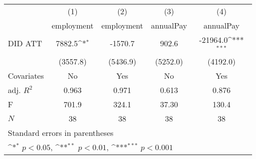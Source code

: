 {
\def\sym#1{\ifmmode^{#1}\else\(^{#1}\)\fi}
\begin{tabular}{l*{4}{c}}
\hline\hline
            &\multicolumn{1}{c}{(1)}&\multicolumn{1}{c}{(2)}&\multicolumn{1}{c}{(3)}&\multicolumn{1}{c}{(4)}\\
            &\multicolumn{1}{c}{employment}&\multicolumn{1}{c}{employment}&\multicolumn{1}{c}{annualPay}&\multicolumn{1}{c}{annualPay}\\
\hline
DID ATT     &      7882.5\sym{*}  &     -1570.7         &       902.6         &    -21964.0\sym{***}\\
            &    (3557.8)         &    (5436.9)         &    (5252.0)         &    (4192.0)         \\
[1em]
Covariates  &          No         &         Yes         &          No         &         Yes         \\
\hline
adj. \(R^{2}\)&       0.963         &       0.971         &       0.613         &       0.876         \\
F           &       701.9         &       324.1         &       37.30         &       130.4         \\
\(N\)       &          38         &          38         &          38         &          38         \\
\hline\hline
\multicolumn{5}{l}{\footnotesize Standard errors in parentheses}\\
\multicolumn{5}{l}{\footnotesize \sym{*} \(p<0.05\), \sym{**} \(p<0.01\), \sym{***} \(p<0.001\)}\\
\end{tabular}
}
